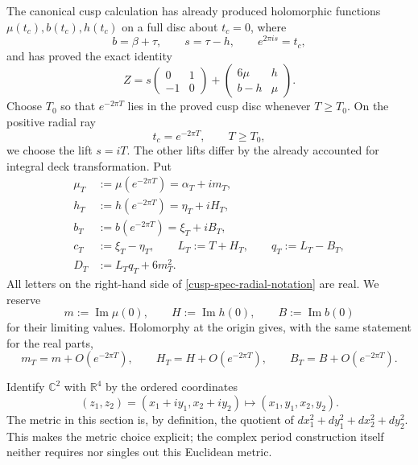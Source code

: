 The canonical cusp calculation has already produced holomorphic functions
\(\mu(t_c),b(t_c),h(t_c)\) on a full disc about \(t_c=0\), where
\[
 b=\beta+\tau,\qquad s=\tau-h,
 \qquad e^{2\pi i s}=t_c,
\]
and has proved the exact identity
\begin{equation}
 Z=s\begin{pmatrix}0&1\\-1&0\end{pmatrix}
 +\begin{pmatrix}6\mu&h\\b-h&\mu\end{pmatrix}.
 \label{cusp-spec-canonical-cusp-input}
\end{equation}
Choose \(T_0\) so that \(e^{-2\pi T}\) lies in the proved cusp disc whenever
\(T\ge T_0\).  On the positive radial ray
\[
 t_c=e^{-2\pi T},\qquad T\ge T_0,
\]
we choose the lift \(s=iT\).  The other lifts differ by the already accounted
for integral deck transformation.  Put
\begin{equation}
 \begin{aligned}
  \mu_T&:=\mu(e^{-2\pi T})=\alpha_T+i m_T,\\
  h_T&:=h(e^{-2\pi T})=\eta_T+i H_T,\\
  b_T&:=b(e^{-2\pi T})=\xi_T+i B_T,\\
  c_T&:=\xi_T-\eta_T,\qquad
  L_T:=T+H_T,\qquad q_T:=L_T-B_T,\\
  D_T&:=L_Tq_T+6m_T^2.
 \end{aligned}
 \label{cusp-spec-radial-notation}
\end{equation}
All letters on the right-hand side of
\cref{cusp-spec-radial-notation} are real.  We reserve
\begin{equation}
 m:=\operatorname{Im}\mu(0),\qquad
 H:=\operatorname{Im}h(0),\qquad
 B:=\operatorname{Im}b(0)
 \label{cusp-spec-limiting-imaginary-parts}
\end{equation}
for their limiting values.  Holomorphy at the origin gives, with the same
statement for the real parts,
\begin{equation}
 m_T=m+O(e^{-2\pi T}),\qquad
 H_T=H+O(e^{-2\pi T}),\qquad
 B_T=B+O(e^{-2\pi T}).
 \label{cusp-spec-holomorphic-errors}
\end{equation}

Identify \(\mathbb C^2\) with \(\mathbb R^4\) by the ordered coordinates
\begin{equation}
 (z_1,z_2)=(x_1+iy_1,x_2+iy_2)
 \longmapsto (x_1,y_1,x_2,y_2).
 \label{cusp-spec-real-coordinate-order}
\end{equation}
The metric in this section is, by definition, the quotient of
\(dx_1^2+dy_1^2+dx_2^2+dy_2^2\).  This makes the metric choice explicit; the
complex period construction itself neither requires nor singles out this
Euclidean metric.

